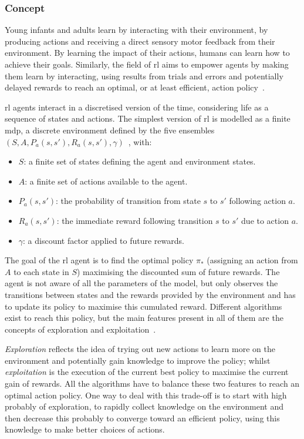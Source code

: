 \subsubsection{Concept} 
	Young infants and adults learn by interacting with their environment, by producing actions and receiving a direct sensory motor feedback from their environment. By learning the impact of their actions, humans can learn how to achieve their goals. Similarly, the field of \gls{rl} aims to empower agents by making them learn by interacting, using results from trials and errors and potentially delayed rewards to reach an optimal, or at least efficient, action policy~\citep{sutton1998reinforcement}. 

	\gls{rl} agents interact in a discretised version of the time, considering life as a sequence of states and actions. The simplest version of \gls{rl} is modelled as a finite \gls{mdp}, a discrete environment defined by the five ensembles $(S, A, P_a(s,s'), R_a(s,s'), \gamma)$~\citep{howard1960dynamic}, with:
	\begin{itemize}
		\item $S$: a finite set of states defining the agent and environment states.
		\item $A$: a finite set of actions available to the agent.
		\item $P_a(s,s')$: the probability of transition from state $s$ to $s'$ following action $a$.
		\item $R_a(s,s')$: the immediate reward following transition $s$ to $s'$ due to action $a$.
		\item $\gamma$: a discount factor applied to future rewards.
	\end{itemize}
	
	The goal of the \gls{rl} agent is to find the optimal policy $\pi_*$ (assigning an action from $A$ to each state in $S$) maximising the discounted sum of future rewards. The agent is not aware of all the parameters of the model, but only observes the transitions between states and the rewards provided by the environment and has to update its policy to maximise this cumulated reward. Different algorithms exist to reach this policy, but the main features present in all of them are the concepts of exploration and exploitation~\citep{sutton1998reinforcement}.
	
	\emph{Exploration} reflects the idea of trying out new actions to learn more on the environment and potentially gain knowledge to improve the policy; whilst \emph{exploitation} is the execution of the current best policy to maximise the current gain of rewards. All the algorithms have to balance these two features to reach an optimal action policy. One way to deal with this trade-off is to start with high probably of exploration, to rapidly collect knowledge on the environment and then decrease this probably to converge toward an efficient policy, using this knowledge to make better choices of actions.
	
